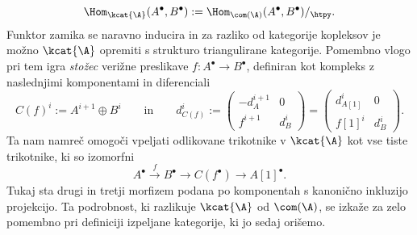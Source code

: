 \[
    \Hom_{\kcat{\A}}(A^\bullet, B^\bullet) := \Hom_{\com(\A)}(A^\bullet, B^\bullet)/_\htpy.
\]
Funktor zamika se naravno inducira in za razliko od kategorije kopleksov je možno $\kcat{\A}$ opremiti s strukturo triangulirane kategorije. Pomembno vlogo pri tem igra \emph{stožec} verižne preslikave $f \colon A^\bullet \to B^\bullet$, definiran kot kompleks z naslednjimi komponentami in diferenciali
\[
    C(f)^i := A^{i+1} \oplus B^i \qquad \text{in} \qquad d^i_{C(f)} := \begin{pmatrix}
            -d^{i+1}_A & 0 \\ f^{i+1} & d^i_B
        \end{pmatrix} = \begin{pmatrix}
            d^i_{A[1]} & 0 \\ f[1]^i & d^i_B
        \end{pmatrix}.
\]
Ta nam namreč omogoči vpeljati odlikovane trikotnike v $\kcat{\A}$ kot vse tiste trikotnike, ki so izomorfni
\[
    A^\bullet \xrightarrow{ \ f \ } B^\bullet \longrightarrow C(f^\bullet) \longrightarrow A[1]^\bullet.
\]
Tukaj sta drugi in tretji morfizem podana po komponentah s kanonično inkluzijo \oz projekcijo. 
Ta podrobnost, ki razlikuje $\kcat{\A}$ od $\com(\A)$, se izkaže za zelo pomembno pri definiciji izpeljane kategorije, ki jo sedaj orišemo.  

